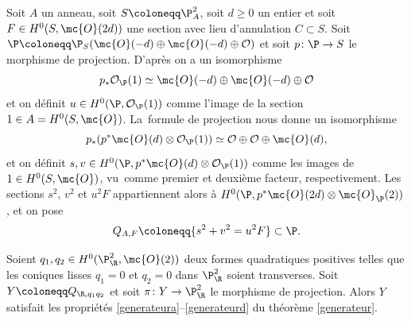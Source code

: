 Soit $A$ un anneau, soit $S\coloneqq \P^2_A$, soit $d\geq 0$ un entier et soit $F \in H^0(S, \mc{O}(2d))$ une section avec lieu d'annulation $C\subset S$. Soit $\P \coloneqq \P_S(\mc{O}(-d) \oplus \mc{O}(-d) \oplus \mathcal{O})$ et soit $p\colon \P\to S$ le morphisme de projection. D'après \cite[Ch.\,2, Prop.\,7.11(a)]{hartshorne} on a un isomorphisme \[p_* \mathcal{O}_{\P}(1) \simeq \mc{O}(-d) \oplus \mc{O}(-d) \oplus \mathcal{O}\] et on définit $u \in H^0(\P, \mathcal{O}_{\P}(1))$ comme l'image de la section $1\in A=H^0(S,\mc{O})$.
La~formule de projection nous donne un isomorphisme
\[ p_*(p^*\mc{O}(d) \otimes \mathcal{O}_{\P}(1)) \simeq \mathcal{O} \oplus \mathcal{O} \oplus \mc{O}(d),\]
et on définit $s, v \in H^0(\P, p^*\mc{O}(d) \otimes \mathcal{O}_{\P}(1))$ comme les images de $1\in H^0(S,\mc{O})$, vu~com\-me premier et deuxième facteur, respectivement. Les sections $s^2$, $v^2$ et $u^2F$ appartiennent alors à $H^0(\P,p^*\mc{O}(2d)\otimes \mc{O}_\P(2))$, et on pose
\[Q_{A,F}\coloneqq \{s^2+v^2=u^2F\}\subset \P.\]

\begin{lemma}\label{refBW}
Soient $q_1,q_2\in H^0(\P^2_\R, \mc{O}(2))$ deux formes quadratiques positives telles que les coniques lisses $q_1=0$ et $q_2=0$ dans $\P^2_\R$ soient transverses. Soit $Y\coloneqq Q_{\R, q_1q_2}$ et soit $\pi \colon Y \to \P^2_{\R}$ le morphisme de projection. Alors $Y$ satisfait les propriétés \eqref{generateura}--\eqref{generateurd} du théorème \ref{generateur}.
\end{lemma}

